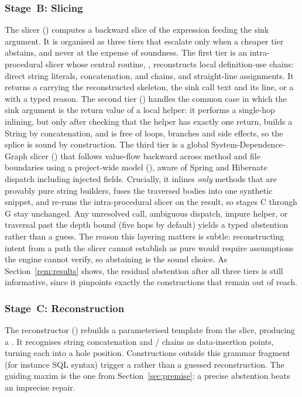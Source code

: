 \subsubsection{Stage~B: Slicing}
The slicer () computes a backward slice of the expression
feeding the sink argument. It is organised as three tiers that escalate only
when a cheaper tier abstains, and never at the expense of soundness. The
first tier is an intra-procedural slicer whose central routine,
, reconstructs local definition-use chains:
direct string literals, \code{+} concatenation,  and
  chains, and straight-line assignments. It
returns a  carrying the reconstructed skeleton, the sink
call text and its line, or a  with a typed reason. The
second tier () handles the common case in
which the sink argument is the return value of a local helper: it performs a
single-hop inlining, but only after checking that the helper has exactly one
return, builds a String by concatenation, and is free of loops, branches and
side effects, so the splice is sound by construction. The third tier is a
global System-Dependence-Graph slicer () that
follows value-flow backward across method and file boundaries using a
project-wide model (), aware of Spring and Hibernate
dispatch including  injected fields. Crucially, it inlines
\emph{only} methods that are provably pure string builders, fuses the
traversed bodies into one synthetic snippet, and re-runs the intra-procedural
slicer on the result, so stages C through G stay unchanged. Any unresolved
call, ambiguous dispatch, impure helper, or traversal past the depth bound
(five hops by default) yields a typed  abstention rather than a
guess. The reason this layering matters is subtle: reconstructing intent
from a path the slicer cannot establish as pure would require assumptions the
engine cannot verify, so abstaining is the sound choice. As
Section~\ref{rem:results} shows, the residual abstention after all three
tiers is still informative, since it pinpoints exactly the constructions that
remain out of reach.

\subsubsection{Stage~C: Reconstruction}
The reconstructor () rebuilds a parameterised template
from the slice, producing a . It recognises
string concatenation and /
 chains as data-insertion points, turning each into a hole
position. Constructions outside this grammar fragment (for instance SQL
  syntax) trigger a
 rather than a guessed reconstruction. The guiding
maxim is the one from Section~\ref{sec:premise}: a precise abstention beats
an imprecise repair.

